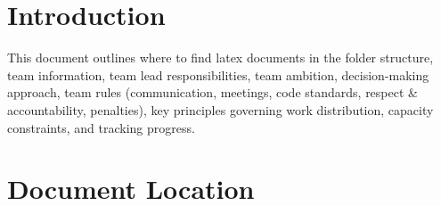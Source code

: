 \documentclass[]{VUMIFTemplateClass}
\begin{document}

\onehalfspacing



\singlespacing
{}



\tableofcontents
\onehalfspacing

\section{Introduction}
This document outlines where to find latex documents in the folder structure,
team information, team lead responsibilities, team ambition, decision-making
approach, team rules (communication, meetings, code standards, respect \&
accountability, penalties), key principles governing work distribution, capacity
constraints, and tracking progress.

\section{Document Location}
\end{document}
